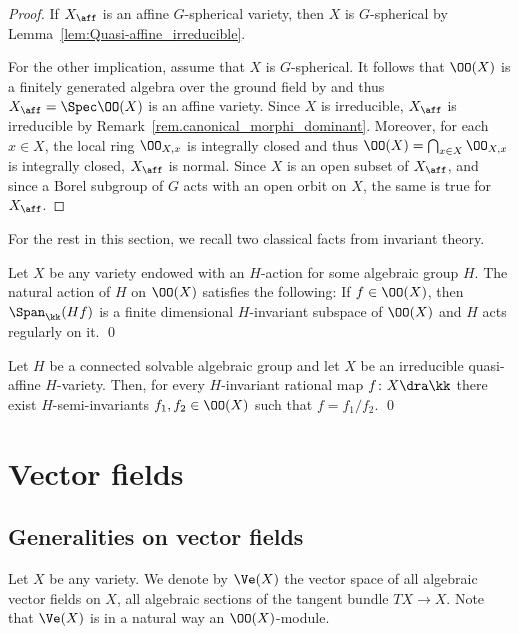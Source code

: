 \begin{proof}
If $X_{\aff}$ is an affine $G$-spherical variety, then $X$ is $G$-spherical by Lemma~\ref{lem:Quasi-affine_irreducible}.

For the other implication,
assume that $X$ is $G$-spherical. It follows that $\OO(X)$ is a
finitely generated algebra over the ground field
by \cite{Kn1993Uber-Hilberts-vier} and thus $X_{\aff} = \Spec \OO(X)$ is an affine variety.
Since $X$ is irreducible, $X_{\aff}$ is irreducible by Remark~\ref{rem.canonical_morphi_dominant}.
Moreover, for each $x \in X$, the local ring $\OO_{X, x}$ is integrally
closed and thus $\OO(X) = \bigcap_{x \in X} \OO_{X, x}$ is integrally closed,
\ie $X_{\aff}$ is normal. Since $X$ is an open subset of $X_{\aff}$,
and since a Borel subgroup of $G$ acts with an open orbit on $X$, the same is true
for $X_{\aff}$.
\end{proof}

For the rest in this section, we recall two classical facts from invariant theory.

\begin{proposition}
\label{prop.locally_finite_and_rational}
Let $X$ be any variety endowed with an $H$-action for some
algebraic group $H$. The natural action of $H$ on $\OO(X)$ satisfies the following:
If $f \in \OO(X)$, then $\Span_{\kk}(Hf)$ is a finite dimensional $H$-invariant subspace
of $\OO(X)$ and $H$ acts regularly on it. \qed
\end{proposition}

\begin{proposition}
\label{prop:H-semi-invariants}
Let $H$ be a connected solvable alge\-braic group and let $X$ be an irreducible
quasi-affine $H$-variety. Then, for every $H$\nobreakdash-inva\-riant rational map
$f \colon X \dra \kk$ there exist $H$-semi-invariants $f_1, f_2 \in \OO(X)$
such that $f = f_1 / f_2$. \qed
\end{proposition}

\section{Vector fields}
\label{sec.vectorfields}

\subsection{Generalities on vector fields}
\label{sec.generalities_on_vectorfields}
Let $X$ be any variety. We denote by
$\Ve(X)$ the vector space of all
algebraic vector fields on $X$, \ie all algebraic sections of the tangent bundle
$T X \to X$. Note that $\Ve(X)$ is in a natural way an $\OO(X)$-module.

